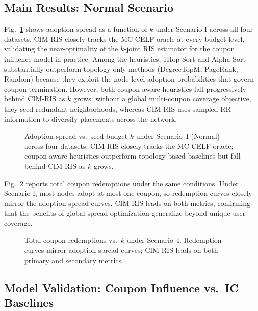 \documentclass[sigconf]{acmart}
\newcommand{\CIMRIS}{\textsc{CIM-RIS}}
\begin{document}
\subsection{Main Results: Normal Scenario}
\label{sec:exp-normal}

Fig.~\ref{fig:normal_spread} shows adoption spread as a function of $k$
under Scenario I across all four datasets.
\CIMRIS{} closely tracks the MC-CELF oracle at every budget level,
validating the near-optimality of the $k$-joint RIS estimator for the
coupon influence model in practice.
Among the heuristics, 1Hop-Sort and Alpha-Sort substantially outperform
topology-only methods (DegreeTopM, PageRank, Random) because they
exploit the node-level adoption probabilities that govern coupon
termination.
However, both coupon-aware heuristics fall progressively behind
\CIMRIS{} as $k$ grows: without a global multi-coupon coverage objective,
they seed redundant neighborhoods, whereas \CIMRIS{} uses sampled RR
information to diversify placements across the network.

\begin{figure}[t]
  \centering
  \caption{Adoption spread vs.\ seed budget $k$ under Scenario~I
    (Normal) across four datasets.
    \CIMRIS{} closely tracks the MC-CELF oracle;
    coupon-aware heuristics outperform topology-based baselines but
    fall behind \CIMRIS{} as $k$ grows.}
  \label{fig:normal_spread}
\end{figure}

Fig.~\ref{fig:normal_redemp} reports total coupon redemptions under the
same conditions.
Under Scenario I, most nodes adopt at most one coupon, so redemption
curves closely mirror the adoption-spread curves.
\CIMRIS{} leads on both metrics, confirming that the benefits of global
spread optimization generalize beyond unique-user coverage.

\begin{figure}[t]
  \centering
  \caption{Total coupon redemptions vs.\ $k$ under Scenario~I.
    Redemption curves mirror adoption-spread curves; \CIMRIS{} leads
    on both primary and secondary metrics.}
  \label{fig:normal_redemp}
\end{figure}

\subsection{Model Validation: Coupon Influence vs.\ IC Baselines}
\label{sec:exp-ic}
\end{document}
